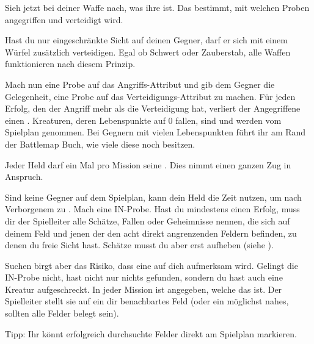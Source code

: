 {			Sieh jetzt bei deiner Waffe nach, was ihre  ist. Das bestimmt, mit welchen Proben angegriffen und verteidigt wird.


			\noindent
			Hast du nur eingeschränkte Sicht auf deinen Gegner, darf er sich mit einem Würfel zusätzlich verteidigen. Egal ob Schwert oder Zauberstab, alle Waffen funktionieren nach diesem Prinzip.

			Mach nun eine Probe auf das Angriffs-Attribut und gib dem Gegner die Gelegenheit, eine Probe auf das Verteidi\-gungs-Attribut zu machen. Für jeden Erfolg, den der Angriff mehr als die Verteidigung hat, verliert der Angegriffene einen . Kreaturen, deren Lebenspunkte auf 0 fallen, sind  und werden vom Spielplan genommen. Bei Gegnern mit vielen Lebenspunkten führt ihr am Rand der Battlemap Buch, wie viele diese noch besitzen.

			Jeder Held darf ein Mal pro Mission seine . Dies nimmt einen ganzen Zug in Anspruch.

			Sind keine Gegner auf dem Spielplan, kann dein Held die Zeit nutzen, um nach Verborgenem zu . Mach eine IN-Probe. Hast du mindestens einen Erfolg, muss dir der Spielleiter alle Schätze, Fallen oder Geheimnisse nennen, die sich auf deinem Feld und jenen der den acht direkt angrenzenden Feldern befinden, zu denen du freie Sicht hast. Schätze musst du aber erst aufheben (siehe ).

			Suchen birgt aber das Risiko, dass eine  auf dich aufmerksam wird. Gelingt die IN-Probe nicht, hast nicht nur nichts gefunden, sondern du hast auch eine Kreatur aufgeschreckt. In jeder Mission ist angegeben, welche das ist. Der Spielleiter stellt sie auf ein dir benachbartes Feld (oder ein möglichst nahes, sollten alle Felder belegt sein).

			Tipp: Ihr könnt erfolgreich durchsuchte Felder direkt am Spielplan markieren.
}

